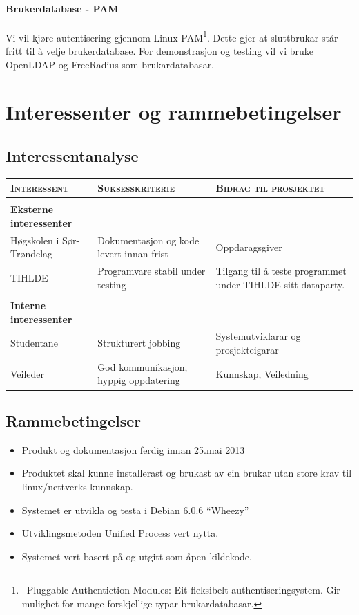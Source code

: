 \documentclass[nynorsk,12pt,a4paper]{article}
\begin{document}
\paragraph{Brukerdatabase - PAM} 
Vi vil kjøre autentisering gjennom Linux PAM\footnote{\ Pluggable Authentiction Modules: Eit fleksibelt authentiseringsystem. Gir mulighet for mange forskjellige typar brukardatabasar.}. Dette gjer at sluttbrukar står fritt til å velje brukerdatabase. For demonstrasjon og testing vil vi bruke OpenLDAP og FreeRadius som brukardatabasar.

\newpage
\section{Interessenter og rammebetingelser}
\subsection{Interessentanalyse}
\begin{table}[h!]
	\begin{tabular}{p{5cm} p{5cm} p{5cm} }
		\textsc{Interessent} & \textsc{Suksesskriterie} & \textsc{Bidrag til prosjektet}\\ \hline \\
		\textbf{Eksterne interessenter} & ~ & ~ \\ 
		Høgskolen i Sør-Trøndelag & Dokumentasjon og kode levert innan frist & Oppdaragsgiver \\ 
		TIHLDE & Programvare stabil under testing & Tilgang til å teste programmet under TIHLDE sitt dataparty. \\ \\
		\textbf{Interne interessenter} & ~ & ~ \\ 
		Studentane & Strukturert jobbing & Systemutviklarar og prosjekteigarar \\ 
		Veileder & God kommunikasjon, hyppig oppdatering & Kunnskap, Veiledning \\ 
	\end{tabular}
\end{table}


\subsection{Rammebetingelser}
\begin{itemize}
	\item Produkt og dokumentasjon ferdig innan 25.mai 2013
	\item Produktet skal kunne installerast og brukast av ein brukar utan store krav til linux/nettverks kunnskap.
	\item Systemet er utvikla og testa i Debian 6.0.6 “Wheezy”
	\item Utviklingsmetoden Unified Process vert nytta.
	\item Systemet vert basert på og utgitt som åpen kildekode. 
\end{itemize}
\end{document}
